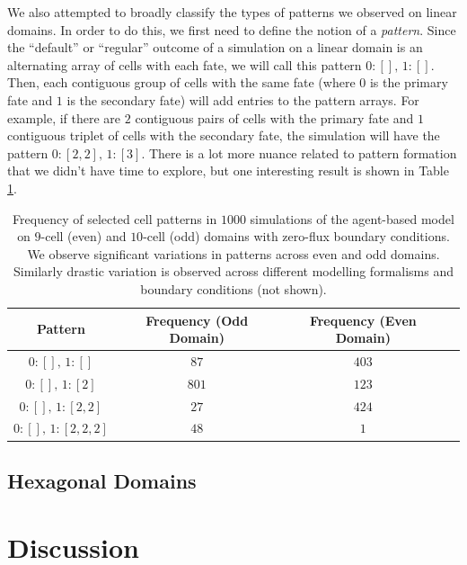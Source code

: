 \documentclass{article}
\begin{document}

We also attempted to broadly classify the types of patterns we observed on linear domains.
In order to do this, we first need to define the notion of a \emph{pattern}.
Since the ``default'' or ``regular'' outcome of a simulation on a linear domain is an alternating array of cells with each fate, we will call this pattern $0: [],\, 1: []$.
Then, each contiguous group of cells with the same fate (where $0$ is the primary fate and $1$ is the secondary fate) will add entries to the pattern arrays.
For example, if there are $2$ contiguous pairs of cells with the primary fate and $1$ contiguous triplet of cells with the secondary fate, the simulation will have the pattern $0: [2, 2], \, 1: [3]$. 
There is a lot more nuance related to pattern formation that we didn't have time to explore, but one interesting result is shown in Table \ref{tb:patterns}.

\begin{table}[!htp]
\centering
\begin{tabular}{|c|c|c|c|} 
 \hline
 Pattern & Frequency (Odd Domain) & Frequency (Even Domain)  \\
 \hline
 $0: [], \, 1: []$ & $87$ & $403$ \\
 $0: [], \, 1: [2]$ & $801$ & $123$ \\
 $0: [], \, 1: [2, 2]$ & $27$ & $424$ \\
 $0: [], \, 1: [2, 2, 2]$ & $48$ & $1$ \\
 \hline
\end{tabular}
\caption{
  Frequency of selected cell patterns in $1000$ simulations of the agent-based model on $9$-cell (even) and $10$-cell (odd) domains with zero-flux boundary conditions. We observe significant variations in patterns across even and odd domains. Similarly drastic variation is observed across different modelling formalisms and boundary conditions (not shown).
}
\label{tb:patterns}
\end{table}

\subsection*{Hexagonal Domains}


\section*{Discussion}
\end{document}
